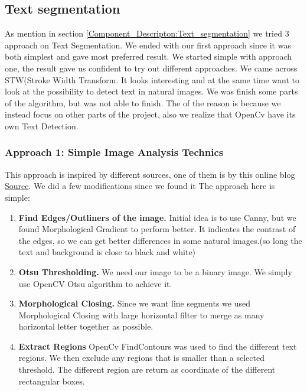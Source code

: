 \documentclass[11pt,a4paper,UKenglish]{article}
\begin{document}
\subsection{Text segmentation}
As mention in section \ref{Component_Descripton:Text_segmentation} we tried 3 approach on Text Segmentation. We ended with our first approach since it was both simplest and gave most preferred result. We started simple with approach one, the result gave us confident to try out different approaches. We came across STW(Stroke Width Transform. It looks interesting and at the same time want to look at the possibility to detect text in natural images. We was finish some parts of the algorithm, but was not able to finish. The of the reason is because we instead focus on other parts of the project, also we realize that OpenCv have its own Text Detection.

\subsubsection{Approach 1: Simple Image Analysis Technics}
This approach is inspired by different sources, one of them is by this online blog \href{https://www.danvk.org/2015/01/07/finding-blocks-of-text-in-an-image-using-python-opencv-and-numpy.html}{Source}\cite{_finding_????}. We did a few modifications since we found it
The approach here is simple:
\begin{enumerate}
  \item \textbf{Find Edges/Outliners of the image.}
  Initial idea is to use Canny, but we found Morphological Gradient to perform better. It indicates the contrast of the edges, so we can get better differences in some natural images.(so long the text and background is close to black and white)
  \item \textbf{Otsu Thresholding.}
  We need our image to be a binary image. We simply use OpenCV Otsu algorithm to achieve it.
  \item \textbf{Morphological Closing.}
  Since we want line segments we used Morphological Closing with large horizontal filter to merge as many horizontal letter together as possible.
  \item \textbf{Extract Regions}
  OpenCv FindContours was used to find the different text regions. We then exclude any regions that is smaller than a selected threshold. The different region are return as coordinate of the different rectangular boxes.
\end{enumerate}
\end{document}
